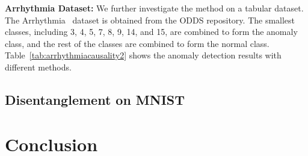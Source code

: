 \documentclass{article} %
\begin{document}



%
%


  
\textbf{Arrhythmia Dataset: }
We further investigate the method on a tabular dataset.  The Arrhythmia~\citep{Dua:2019} dataset is  obtained from the ODDS repository. The smallest classes, including 3, 4, 5, 7, 8, 9, 14, and 15, are combined to form the anomaly class, and the rest of the classes are combined to form the normal class. Table~\ref{tab:arrhythmiacausality2} shows the anomaly detection results with different methods. 


\subsection{Disentanglement on MNIST}


\section{Conclusion}\label{sec:conclusion}
\end{document}
